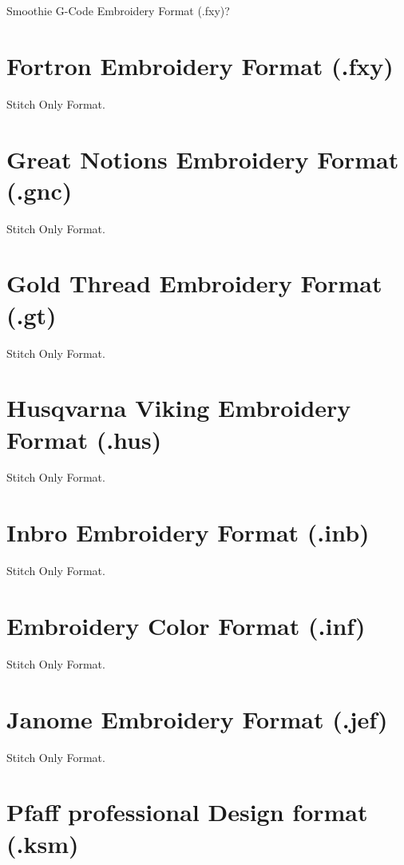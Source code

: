 \documentclass{report}
\begin{document}
Smoothie G-Code Embroidery Format (.fxy)?

\section{Fortron Embroidery Format (.fxy)}

Stitch Only Format.

\section{Great Notions Embroidery Format (.gnc)}

Stitch Only Format.

\section{Gold Thread Embroidery Format (.gt)}

Stitch Only Format.

\section{Husqvarna Viking Embroidery Format (.hus)}

Stitch Only Format.

\section{Inbro Embroidery Format (.inb)}

Stitch Only Format.

\section{Embroidery Color Format (.inf)}

Stitch Only Format.

\section{Janome Embroidery Format (.jef)}

Stitch Only Format.

\section{Pfaff professional Design format (.ksm)}
\end{document}
